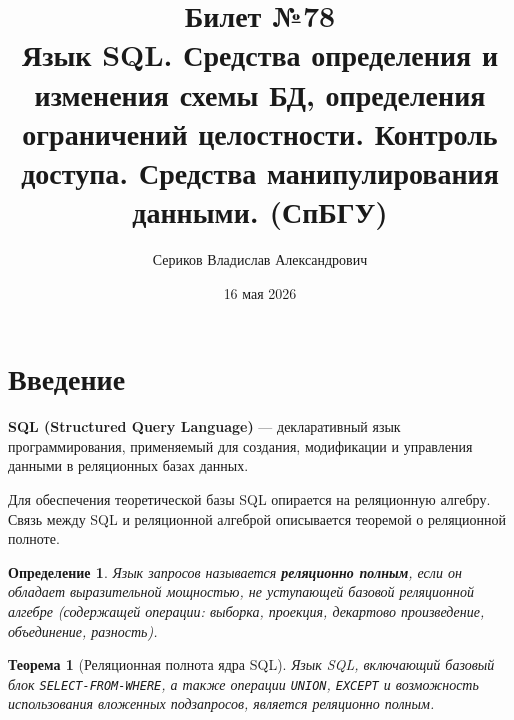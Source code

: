 \documentclass[12pt,a4paper]{article}
\title{Билет №78 \\ \small Язык SQL. Средства определения и изменения схемы БД, определения ограничений целостности. Контроль доступа. Средства манипулирования данными. (СпБГУ)}
\author{Сериков Владислав Александрович}
\date{16 мая 2026}
\newtheorem{theorem}{Теорема}
\newtheorem{definition}{Определение}
\begin{document}
\maketitle
\tableofcontents
\newpage

\section{Введение}
\textbf{SQL (Structured Query Language)} --- декларативный язык программирования, применяемый для создания, модификации и управления данными в реляционных базах данных.

Для обеспечения теоретической базы SQL опирается на реляционную алгебру. Связь между SQL и реляционной алгеброй описывается теоремой о реляционной полноте.

\begin{definition}
Язык запросов называется \textbf{реляционно полным}, если он обладает выразительной мощностью, не уступающей базовой реляционной алгебре (содержащей операции: выборка, проекция, декартово произведение, объединение, разность).
\end{definition}

\begin{theorem}[Реляционная полнота ядра SQL]
Язык SQL, включающий базовый блок \texttt{SELECT-FROM-WHERE}, а также операции \texttt{UNION}, \texttt{EXCEPT} и возможность использования вложенных подзапросов, является реляционно полным.
\end{theorem}
\end{document}
